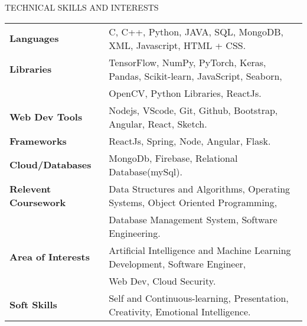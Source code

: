 \documentclass{resume} %
\begin{document}
\begin{rSection}{TECHNICAL SKILLS AND INTERESTS}

\begin{tabular}{ @{} >{\bfseries}l @{\hspace{6ex}} l }
Languages & C, C++, Python, JAVA, SQL, MongoDB, XML, Javascript, HTML + CSS.
\\
Libraries & TensorFlow, NumPy, PyTorch, Keras, Pandas, Scikit-learn, JavaScript, Seaborn,\\& OpenCV, Python Libraries, ReactJs.\\
Web Dev Tools &  Nodejs, VScode, Git, Github, Bootstrap, Angular, React, Sketch.\\
Frameworks &  ReactJs, Spring, Node, Angular, Flask.\\
Cloud/Databases & MongoDb, Firebase, Relational Database(mySql).\\
Relevent Coursework &  Data Structures and Algorithms, Operating Systems, Object Oriented Programming,\\ & Database Management System, Software Engineering.\\
Area of Interests &    Artificial Intelligence and Machine Learning Development, Software Engineer, \\ &Web Dev, Cloud Security.\\
Soft Skills &  Self and Continuous-learning, Presentation, Creativity, Emotional Intelligence.
\\
\end{tabular}\\
\end{rSection}
\end{document}

